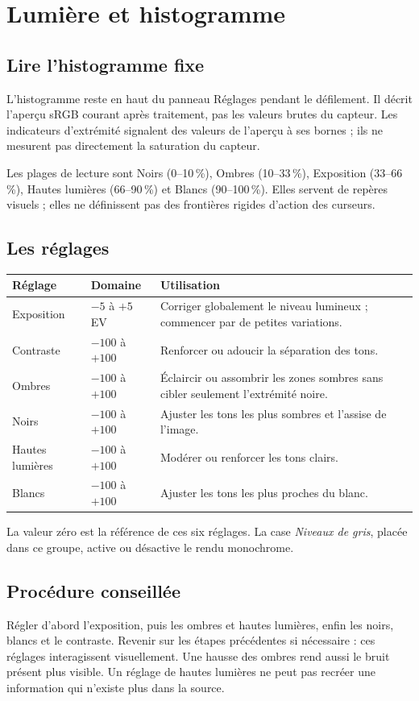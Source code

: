 \chapter{Lumière et histogramme}
\section{Lire l’histogramme fixe}
L’histogramme reste en haut du panneau Réglages pendant le défilement.
Il décrit l’aperçu sRGB courant après traitement, pas les valeurs brutes du
capteur. Les indicateurs d’extrémité signalent des valeurs de l’aperçu à ses
bornes ; ils ne mesurent pas directement la saturation du capteur.

Les plages de lecture sont Noirs (0--10\,\%), Ombres (10--33\,\%),
Exposition (33--66\,\%), Hautes lumières (66--90\,\%) et Blancs (90--100\,\%).
Elles servent de repères visuels ; elles ne définissent pas des frontières
rigides d’action des curseurs.

\section{Les réglages}
\begin{longtable}{@{}L{3cm}L{2.8cm}L{7.8cm}@{}}
\toprule Réglage & Domaine & Utilisation\\\midrule\endhead
Exposition & $-5$ à $+5$ EV & Corriger globalement le niveau lumineux ; commencer par de petites variations.\\
Contraste & $-100$ à $+100$ & Renforcer ou adoucir la séparation des tons.\\
Ombres & $-100$ à $+100$ & Éclaircir ou assombrir les zones sombres sans cibler seulement l’extrémité noire.\\
Noirs & $-100$ à $+100$ & Ajuster les tons les plus sombres et l’assise de l’image.\\
Hautes lumières & $-100$ à $+100$ & Modérer ou renforcer les tons clairs.\\
Blancs & $-100$ à $+100$ & Ajuster les tons les plus proches du blanc.\\
\bottomrule
\end{longtable}
La valeur zéro est la référence de ces six réglages. La case \emph{Niveaux
de gris}, placée dans ce groupe, active ou désactive le rendu monochrome.

\section{Procédure conseillée}
Régler d’abord l’exposition, puis les ombres et hautes lumières, enfin les
noirs, blancs et le contraste. Revenir sur les étapes précédentes si nécessaire :
ces réglages interagissent visuellement. Une hausse des ombres rend aussi le
bruit présent plus visible. Un réglage de hautes lumières ne peut pas recréer
une information qui n’existe plus dans la source.

